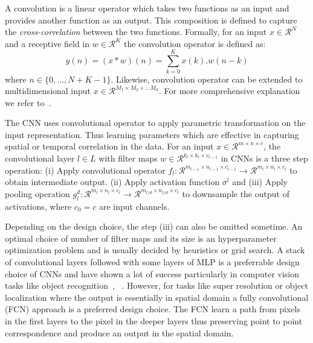 A convolution is a linear operator which takes two functions as an input and provides another function as an output. This composition is defined to capture the \emph{cross-correlation} between the two functions. Formally, for an input $x\in \mathcal{R}^N$ and a receptive field in $w\in \mathcal{R}^K$ the convolution operator is defined as:
\begin{equation}
\label{eq:conv}
    y(n) = (x * w)(n)  = \sum_{k=0}^{K} x(k).w(n-k)
\end{equation}
where $n\in\{0,...,N+K-1\}$. Likewise, convolution operator can be extended to multidimensional input $x\in\mathcal{R}^{M_1\times M_2\times ...M_d}$. For more comprehensive explanation we refer to~\cite{Goodfellow-et-al-2016}.

The CNN uses convolutional operator to apply parametric transformation on the input representation. Thus learning parameters which are effective in capturing spatial or temporal correlation in the data. For an input $x\in\mathcal{R}^{m\times n \times c}$, the convolutional layer  $l\in L$ with filter maps $w\in\mathcal{R}^{k_l \times k_l \times c_{l-1}}$ in CNNs is a three step operation: (i) Apply convolutional operator $f_l:\mathcal{R}^{m_{l-1}\times n_{l-1}\times c_{l-1}} \rightarrow\mathcal{R}^{m_{l}\times n_{l}\times c_{l}}$ to obtain intermediate output. (ii) Apply activation function $\sigma^{l}$ and (iii) Apply pooling operation $g_l^d:\mathcal{R}^{m_{l}\times n_{l}\times c_{l}}\rightarrow \mathcal{R}^{m_{l/d}\times n_{l/d}\times c_{l}}$ to downsample the output of activations, where $c_0 = c$ are input channels.

Depending on the design choice, the step (iii) can also be omitted sometime. An optimal choice of number of filter maps and its size is an hyperparameter optimization problem and is usually decided by heuristics or grid search. A stack of convolutional layers followed with some layers of MLP is a preferrable design choice of CNNs and have shown a lot of success particularly in computer vision tasks like object recognition~\cite{krizhevsky2012imagenet}, ~\cite{donahue2014decaf}. However, for tasks like super resolution or object localization where the output is essentially in spatial domain
a fully convolutional (FCN) approach is a preferred design choice. The FCN learn a path from pixels in the first layers to the pixel in the deeper layers thus preserving point to point correspondence and produce an output in the spatial domain. 


